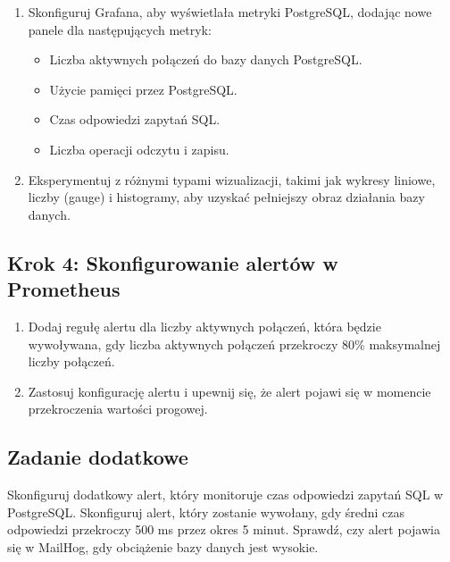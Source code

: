 \documentclass{article}
\begin{document}
\begin{enumerate}
    \item Skonfiguruj Grafana, aby wyświetlała metryki PostgreSQL, dodając nowe panele dla następujących metryk:
    \begin{itemize}
        \item Liczba aktywnych połączeń do bazy danych PostgreSQL.
        \item Użycie pamięci przez PostgreSQL.
        \item Czas odpowiedzi zapytań SQL.
        \item Liczba operacji odczytu i zapisu.
    \end{itemize}

    \item Eksperymentuj z różnymi typami wizualizacji, takimi jak wykresy liniowe, liczby (gauge) i histogramy, aby uzyskać pełniejszy obraz działania bazy danych.
\end{enumerate}

\subsection{Krok 4: Skonfigurowanie alertów w Prometheus}

\begin{enumerate}
    \item Dodaj regułę alertu dla liczby aktywnych połączeń, która będzie wywoływana, gdy liczba aktywnych połączeń przekroczy 80\% maksymalnej liczby połączeń.
    
    \item Zastosuj konfigurację alertu i upewnij się, że alert pojawi się w momencie przekroczenia wartości progowej.
\end{enumerate}

\subsection{Zadanie dodatkowe}

Skonfiguruj dodatkowy alert, który monitoruje czas odpowiedzi zapytań SQL w PostgreSQL. Skonfiguruj alert, który zostanie wywołany, gdy średni czas odpowiedzi przekroczy 500 ms przez okres 5 minut. Sprawdź, czy alert pojawia się w MailHog, gdy obciążenie bazy danych jest wysokie.
\end{document}
